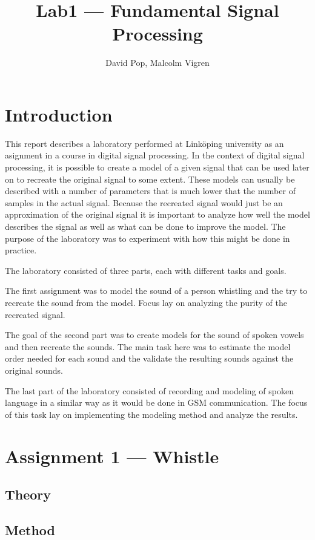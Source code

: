\documentclass{IEEEtran}
\begin{document}
\title{Lab1 --- Fundamental Signal Processing}
\author{David Pop, Malcolm Vigren}

\maketitle

\section{Introduction}
This report describes a laboratory performed at Linköping university as an
asignment in a course in digital signal processing. In the context of
digital signal processing, it is possible to create a model of a given
signal that can be used later on to recreate the original signal to some
extent. These models can usually be described with a number of parameters
that is much lower that the number of samples in the actual signal. Because
the recreated signal would just be an approximation of the original signal
it is important to analyze how well the model describes the signal as well
as what can be done to improve the model. The purpose of the laboratory was
to experiment with how this might be done in practice.

The laboratory consisted of three parts, each with different tasks and
goals.

The first assignment was to model the sound of a person whistling and the
try to recreate the sound from the model. Focus lay on analyzing the purity
of the recreated signal.

The goal of the second part was to create models for the sound of spoken
vowels and then recreate the sounds. The main task here was to estimate
the model order needed for each sound and the validate the resulting
sounds against the original sounds.

The last part of the laboratory consisted of recording and modeling of
spoken language in a similar way as it would be done in GSM communication.
The focus of this task lay on implementing the modeling method and analyze
the results.

\section{Assignment 1 --- Whistle}

\subsection{Theory}
\subsection{Method}
\end{document}
